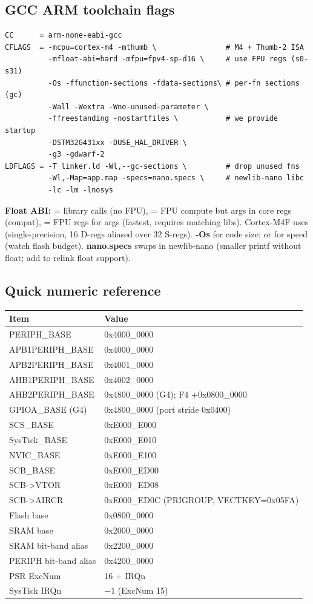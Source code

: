 \subsection{GCC ARM toolchain flags}
\begin{lstlisting}[language={}]
CC      = arm-none-eabi-gcc
CFLAGS  = -mcpu=cortex-m4 -mthumb \                # M4 + Thumb-2 ISA
          -mfloat-abi=hard -mfpu=fpv4-sp-d16 \     # use FPU regs (s0-s31)
          -Os -ffunction-sections -fdata-sections\ # per-fn sections (gc)
          -Wall -Wextra -Wno-unused-parameter \
          -ffreestanding -nostartfiles \           # we provide startup
          -DSTM32G431xx -DUSE_HAL_DRIVER \
          -g3 -gdwarf-2
LDFLAGS = -T linker.ld -Wl,--gc-sections \         # drop unused fns
          -Wl,-Map=app.map -specs=nano.specs \     # newlib-nano libc
          -lc -lm -lnosys
\end{lstlisting}
\textbf{Float ABI:}  = library calls (no FPU),  = FPU compute but args in core regs (compat),  = FPU regs for args (fastest, requires matching libs). Cortex-M4F uses  (single-precision, 16 D-regs aliased over 32 S-regs).
\textbf{-Os} for code size;  or  for speed (watch flash budget).
\textbf{nano.specs} swaps in newlib-nano (smaller printf without float; add \cee{-u \_printf\_float} to relink float support).

\subsection{Quick numeric reference}
\begin{tabular}{@{}lp{}@{}}
\toprule
\textbf{Item} & \textbf{Value}\\
\midrule
PERIPH\_BASE & 0x4000\_0000\\
APB1PERIPH\_BASE & 0x4000\_0000\\
APB2PERIPH\_BASE & 0x4001\_0000\\
AHB1PERIPH\_BASE & 0x4002\_0000\\
AHB2PERIPH\_BASE & 0x4800\_0000 (G4); F4 +0x0800\_0000\\
GPIOA\_BASE (G4) & 0x4800\_0000 (port stride 0x0400)\\
SCS\_BASE & 0xE000\_E000\\
SysTick\_BASE & 0xE000\_E010\\
NVIC\_BASE & 0xE000\_E100\\
SCB\_BASE & 0xE000\_ED00\\
SCB->VTOR & 0xE000\_ED08\\
SCB->AIRCR & 0xE000\_ED0C (PRIGROUP, VECTKEY=0x05FA)\\
Flash base & 0x0800\_0000\\
SRAM base & 0x2000\_0000\\
SRAM bit-band alias & 0x2200\_0000\\
PERIPH bit-band alias & 0x4200\_0000\\
PSR ExcNum & 16 + IRQn\\
SysTick IRQn & $-1$ (ExcNum 15)\\
\bottomrule
\end{tabular}

